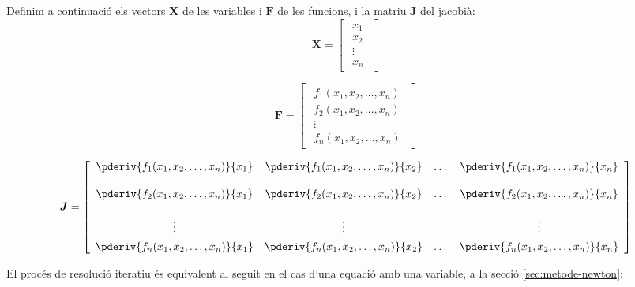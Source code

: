 Definim a continuació els vectors $\boldsymbol{X}$ de les variables i $\boldsymbol{F}$ de les funcions, i la matriu  $\boldsymbol{J}$ del jacobià:
\begin{equation}
	\boldsymbol{X} =  
	\begin{bmatrix}\begin{array}{c} 
			x_1 \\
			x_2 \\
			\vdots{} \\
			x_n
	\end{array}\end{bmatrix}
\end{equation}

\begin{equation}
	\boldsymbol{F} =  
	\begin{bmatrix}\begin{array}{c} 
			f_1(x_1, x_2, \dots, x_n) \\[1ex]
			f_2(x_1, x_2, \dots, x_n) \\
			\vdots{} \\
			f_n(x_1, x_2, \dots, x_n)
	\end{array}\end{bmatrix}
\end{equation}

\begin{equation}
	\boldsymbol{J} =  
	\begin{bmatrix}\begin{array}{cccc} 
			\displaystyle
			\pderiv{f_1(x_1, x_2, \dots, x_n)}{x_1} & 
			\displaystyle
			\pderiv{f_1(x_1, x_2, \dots, x_n)}{x_2} & 
			\dots{} &
			\displaystyle
			\pderiv{f_1(x_1, x_2, \dots, x_n)}{x_n} \\[3ex]
			\displaystyle
			\pderiv{f_2(x_1, x_2, \dots, x_n)}{x_1} & 
			\displaystyle
			\pderiv{f_2(x_1, x_2, \dots, x_n)}{x_2} & 
			\dots{} &
			\displaystyle
			\pderiv{f_2(x_1, x_2, \dots, x_n)}{x_n} \\[3ex]
			\vdots{} & \vdots{} & {} & \vdots{} \\[1ex]
			\displaystyle
			\pderiv{f_n(x_1, x_2, \dots, x_n)}{x_1} & 
			\displaystyle
			\pderiv{f_n(x_1, x_2, \dots, x_n)}{x_2} & 
			\dots{} &
			\displaystyle
			\pderiv{f_n(x_1, x_2, \dots, x_n)}{x_n}
	\end{array}\end{bmatrix}
\end{equation}


El procés de resolució iteratiu és equivalent al seguit en el cas d'una  equació amb una variable, a la secció \vref{sec:metode-newton}:

